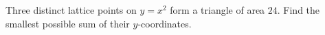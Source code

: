 Three distinct lattice points on $y=x^2$ form a triangle of area $24$. Find the smallest possible sum of their $y$-coordinates.
